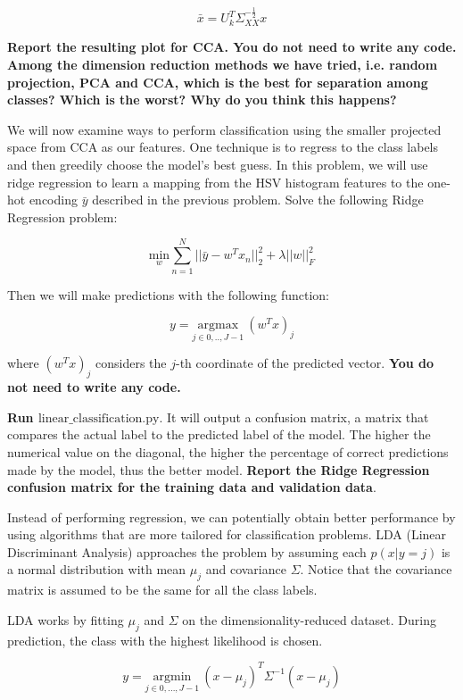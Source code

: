 \documentclass[preview]{standalone}
\begin{document}
\begin{Parts}
$$\bar{x} = U_k^T \Sigma_{XX}^{-\frac{1}{2}} x$$

{\bf Report the resulting plot for CCA. You do not need to write any
  code. Among the dimension reduction methods we have tried,
  i.e. random projection, PCA and CCA, which is the best for
  separation among classes? Which is the worst? Why do you think this happens?}




\Part We will now examine ways to perform classification using the
smaller projected space from CCA as our features. One technique is to regress to the class labels and then greedily choose the model's best guess. In this problem, we will use ridge regression to learn a mapping from the HSV histogram features to the one-hot encoding $\bar{y}$ described in the previous problem.  Solve the following Ridge Regression problem:

$$\underset{w}{\mbox{min}} \sum^{N}_{n=1} ||\bar{y} - w^Tx_n||_2^2 + \lambda ||w||^2_F$$

Then we will make predictions with the following function:

$$y = \underset{j\in{0,..,J-1}}{\mbox{argmax}} \: (w^Tx)_j$$

where $(w^Tx)_j$ considers the $j$-th coordinate of the predicted vector. {\bf You do not need to write any code.}

{\bf Run $\mbox{linear\_classification.py}$}. It will output a confusion matrix, a matrix that compares the actual label to the predicted label of the model. The higher the numerical value on the diagonal, the higher the percentage of correct predictions made by the model, thus the better model. {\bf Report the Ridge Regression confusion matrix for the training data and validation data}.



\Part Instead of performing regression, we can potentially obtain
better performance by using algorithms that are more tailored for
classification problems. LDA (Linear Discriminant Analysis) approaches the problem by assuming each $p(x | y =j)$ is a normal distribution with mean $\mu_j$ and covariance $\Sigma$. Notice that the covariance matrix is assumed to be the same for all the class labels. 

LDA works by fitting $\mu_j$ and $\Sigma$ on the dimensionality-reduced dataset. During prediction, the class with the highest likelihood is chosen. 

$$y = \underset{j\in{0,...,J-1}}{\mbox{argmin}} \: (x-\mu_j)^T\Sigma^{-1}(x-\mu_j)$$


\end{Parts}
\end{document}

